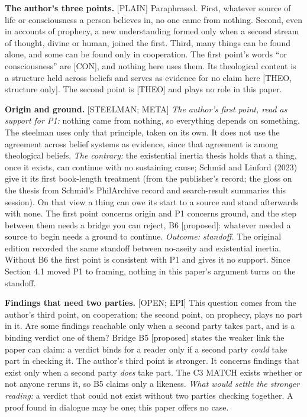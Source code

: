 \documentclass[11pt]{article}
\newcommand{\register}[1]{{\ttfamily\small #1}}
\begin{document}
\textbf{The author's three points.} \register{[PLAIN]} Paraphrased. First, whatever source of life or consciousness a person believes in, no one came from nothing. Second, even in accounts of prophecy, a new understanding formed only when a second stream of thought, divine or human, joined the first. Third, many things can be found alone, and some can be found only in cooperation. The first point's words ``or consciousness'' are [CON], and nothing here uses them. Its theological content is a structure held across beliefs and serves as evidence for no claim here [THEO, structure only]. The second point is [THEO] and plays no role in this paper.

\textbf{Origin and ground.} \register{[STEELMAN; META]} \emph{The author's first point, read as support for P1:} nothing came from nothing, so everything depends on something. The steelman uses only that principle, taken on its own. It does not use the agreement across belief systems as evidence, since that agreement is among theological beliefs. \emph{The contrary:} the existential inertia thesis holds that a thing, once it exists, can continue with no sustaining cause; Schmid and Linford (2023) give it its first book-length treatment (from the publisher's record; the gloss on the thesis from Schmid's PhilArchive record and search-result summaries this session). On that view a thing can owe its start to a source and stand afterwards with none. The first point concerns origin and P1 concerns ground, and the step between them needs a bridge you can reject, B6 [proposed]: whatever needed a source to begin needs a ground to continue. \emph{Outcome: standoff.} The original edition recorded the same standoff between no-aseity and existential inertia. Without B6 the first point is consistent with P1 and gives it no support. Since Section 4.1 moved P1 to framing, nothing in this paper's argument turns on the standoff.

\textbf{Findings that need two parties.} \register{[OPEN; EPI]} This question comes from the author's third point, on cooperation; the second point, on prophecy, plays no part in it. Are some findings reachable only when a second party takes part, and is a binding verdict one of them? Bridge B5 [proposed] states the weaker link the paper can claim: a verdict binds for a reader only if a second party \emph{could} take part in checking it. The author's third point is stronger. It concerns findings that exist only when a second party \emph{does} take part. The C3 MATCH exists whether or not anyone reruns it, so B5 claims only a likeness. \emph{What would settle the stronger reading:} a verdict that could not exist without two parties checking together. A proof found in dialogue may be one; this paper offers no case.
\end{document}
